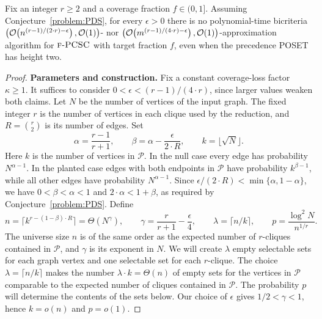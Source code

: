 \begin{theorem}\label{thm:PCSC-PDS-clique-hardness}
    \setlength{\emergencystretch}{1em}
    Fix an integer $r\geq2$ and a coverage fraction $f\in(0,1]$. Assuming Conjecture~\ref{problem:PDS}, for every $\epsilon>0$ there is no polynomial-time bicriteria $\mathopen{}\left( \mathcal{O}\mathopen{}\left( n^{(r-1)/(2\cdot r)-\epsilon} \right),\mathcal{O}\mathopen{}\left( 1 \right) \right)$- nor $\mathopen{}\left( \mathcal{O}\mathopen{}\left( m^{(r-1)/(4\cdot r)-\epsilon} \right),\mathcal{O}\mathopen{}\left( 1 \right) \right)$-approximation algorithm for $\textup{\textsc{f-PCSC}}$ with target fraction $f$, even when the precedence POSET has height two.
\end{theorem}
\begin{proof}
    \par\noindent\textbf{Parameters and construction.}
    Fix a constant coverage-loss factor $\kappa\geq1$. It suffices to consider $0<\epsilon<(r-1)/(4\cdot r)$, since larger values weaken both claims. Let $N$ be the number of vertices of the input graph. The fixed integer $r$ is the number of vertices in each clique used by the reduction, and $R=\binom{r}{2}$ is its number of edges. Set
    \[
        \alpha=\frac{r-1}{r+1},\qquad \beta=\alpha-\frac{\epsilon}{2\cdot R},
        \qquad k=\lfloor\sqrt{N}\rfloor.
    \]
    Here $k$ is the number of vertices in $\mathcal P$. In the null case every edge has probability $N^{\alpha-1}$. In the planted case edges with both endpoints in $\mathcal P$ have probability $k^{\beta-1}$, while all other edges have probability $N^{\alpha-1}$. Since $\epsilon/(2\cdot R)<\min\{\alpha,1-\alpha\}$, we have $0<\beta<\alpha<1$ and $2\cdot\alpha<1+\beta$, as required by Conjecture~\ref{problem:PDS}. Define
    \[
        n=\lceil k^{r-(1-\beta)\cdot R}\rceil=\Theta(N^\gamma),\qquad
        \gamma=\frac{r}{r+1}-\frac\epsilon4,\qquad
        \lambda=\lceil n/k\rceil,\qquad p=\frac{\log^2 N}{n^{1/r}}.
    \]
    The universe size $n$ is of the same order as the expected number of $r$-cliques contained in $\mathcal P$, and $\gamma$ is its exponent in $N$. We will create $\lambda$ empty selectable sets for each graph vertex and one selectable set for each $r$-clique. The choice $\lambda=\lceil n/k\rceil$ makes the number $\lambda\cdot k=\Theta(n)$ of empty sets for the vertices in $\mathcal P$ comparable to the expected number of cliques contained in $\mathcal P$. The probability $p$ will determine the contents of the sets below. Our choice of $\epsilon$ gives $1/2<\gamma<1$, hence $k=o(n)$ and $p=o(1)$.


\end{proof}
